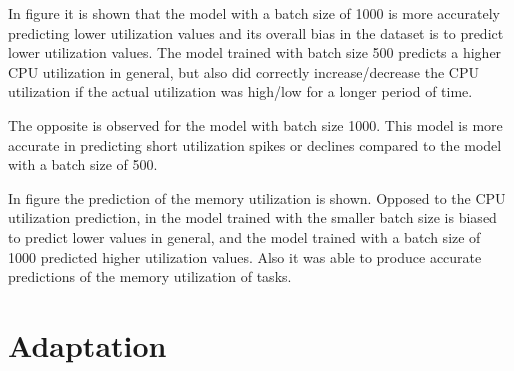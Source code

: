   In figure 
   it is shown that the model with a batch size of 1000 is more accurately predicting lower utilization values and its overall bias in the dataset is to predict lower utilization values.
  The model trained with batch size 500 predicts a higher CPU utilization in general, but also did correctly increase/decrease the CPU utilization if the actual utilization was high/low for a longer period of time.

  The opposite is observed for the model with batch size 1000. 
  This model is more accurate in predicting short utilization spikes or declines compared to the model with a batch size of 500.
  


  In figure 
  the prediction of the memory utilization is shown.
  Opposed to the CPU utilization prediction, in the model trained with the smaller batch size is biased to predict lower values in general, and the model trained with a batch size of 1000 predicted higher utilization values. Also it was able to produce accurate predictions of the memory utilization of tasks.
  

    



\section{Adaptation}

